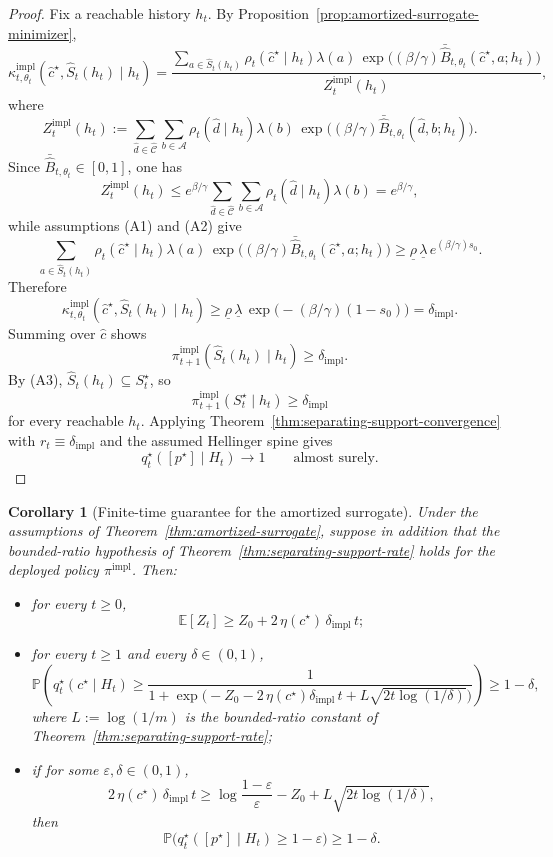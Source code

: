 \documentclass[11pt]{article}
\newtheorem{corollary}[theorem]{Corollary}
\theoremstyle{definition}
\theoremstyle{remark}
\newcommand{\Acal}{\mathcal{A}}
\newcommand{\Ccal}{\mathcal{C}}
\newcommand{\E}{\mathbb{E}}
\newcommand{\Prob}{\mathbb{P}}
\begin{document}
\begin{proof}
Fix a reachable history $h_t$. By Proposition~\ref{prop:amortized-surrogate-minimizer},
\[
\kappa_{t,\theta_t}^{\mathrm{impl}}(\hat c^\star,\widehat S_t(h_t)\mid h_t)
=
\frac{
\sum_{a\in\widehat S_t(h_t)}
\rho_t(\hat c^\star\mid h_t)\lambda(a)\,
\exp\!\bigl((\beta/\gamma)\bar{\widehat B}_{t,\theta_t}(\hat c^\star,a;h_t)\bigr)}
{Z_t^{\mathrm{impl}}(h_t)},
\]
where
\[
Z_t^{\mathrm{impl}}(h_t)
:=
\sum_{\hat d\in\widehat{\Ccal}}\sum_{b\in\Acal}
\rho_t(\hat d\mid h_t)\lambda(b)\,
\exp\!\bigl((\beta/\gamma)\bar{\widehat B}_{t,\theta_t}(\hat d,b;h_t)\bigr).
\]
Since $\bar{\widehat B}_{t,\theta_t}\in[0,1]$, one has
\[
Z_t^{\mathrm{impl}}(h_t)\le e^{\beta/\gamma}
\sum_{\hat d\in\widehat{\Ccal}}\sum_{b\in\Acal}
\rho_t(\hat d\mid h_t)\lambda(b)
=
e^{\beta/\gamma},
\]
while assumptions \textup{(A1)} and \textup{(A2)} give
\[
\sum_{a\in\widehat S_t(h_t)}
\rho_t(\hat c^\star\mid h_t)\lambda(a)\,
\exp\!\bigl((\beta/\gamma)\bar{\widehat B}_{t,\theta_t}(\hat c^\star,a;h_t)\bigr)
\ge
\underline\rho\,\underline\lambda\,e^{(\beta/\gamma)s_0}.
\]
Therefore
\[
\kappa_{t,\theta_t}^{\mathrm{impl}}(\hat c^\star,\widehat S_t(h_t)\mid h_t)
\ge
\underline\rho\,\underline\lambda\,
\exp\!\bigl(-(\beta/\gamma)(1-s_0)\bigr)
=
\delta_{\mathrm{impl}}.
\]
Summing over $\hat c$ shows
\[
\pi_{t+1}^{\mathrm{impl}}(\widehat S_t(h_t)\mid h_t)\ge \delta_{\mathrm{impl}}.
\]
By \textup{(A3)}, $\widehat S_t(h_t)\subseteq S_t^\star$, so
\[
\pi_{t+1}^{\mathrm{impl}}(S_t^\star\mid h_t)\ge \delta_{\mathrm{impl}}
\]
for every reachable $h_t$. Applying Theorem~\ref{thm:separating-support-convergence} with $r_t\equiv \delta_{\mathrm{impl}}$ and the assumed Hellinger spine gives
\[
q_t^\star([p^\star]\mid H_t)\to 1
\qquad\text{almost surely.}
\]
\end{proof}

\begin{corollary}[Finite-time guarantee for the amortized surrogate]
\label{cor:amortized-surrogate-finite-time}
Under the assumptions of Theorem~\ref{thm:amortized-surrogate}, suppose in addition that the bounded-ratio hypothesis of Theorem~\ref{thm:separating-support-rate} holds for the deployed policy $\pi^{\mathrm{impl}}$. Then:
\begin{itemize}
\item[(i)] for every $t\ge 0$,
\[
\E[Z_t]\ge Z_0+2\,\eta(c^\star)\,\delta_{\mathrm{impl}}\,t;
\]
\item[(ii)] for every $t\ge 1$ and every $\delta\in(0,1)$,
\[
\Prob\!\left(
q_t^\star(c^\star\mid H_t)\ge
\frac{1}{1+\exp\!\bigl(-Z_0-2\,\eta(c^\star)\delta_{\mathrm{impl}}\,t+L\sqrt{2t\log(1/\delta)}\bigr)}
\right)\ge 1-\delta,
\]
where $L:=\log(1/m)$ is the bounded-ratio constant of Theorem~\ref{thm:separating-support-rate};
\item[(iii)] if for some $\varepsilon,\delta\in(0,1)$,
\[
2\,\eta(c^\star)\,\delta_{\mathrm{impl}}\,t
\ge
\log\frac{1-\varepsilon}{\varepsilon}-Z_0+L\sqrt{2t\log(1/\delta)},
\]
then
\[
\Prob\!\bigl(q_t^\star([p^\star]\mid H_t)\ge 1-\varepsilon\bigr)\ge 1-\delta.
\]
\end{itemize}
\end{corollary}
\end{document}
